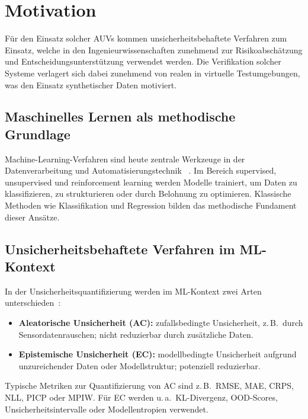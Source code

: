 
\chapter{Motivation}
\label{chapter:motivation}

Für den Einsatz solcher AUVs kommen unsicherheitsbehaftete Verfahren zum Einsatz, welche in den Ingenieurwissenschaften zunehmend zur Risikoabschätzung und Entscheidungsunterstützung verwendet werden. Die Verifikation solcher Systeme verlagert sich dabei zunehmend von realen in virtuelle Testumgebungen, was den Einsatz synthetischer Daten motiviert.

\section{Maschinelles Lernen als methodische Grundlage}

Machine-Learning-Verfahren sind heute zentrale Werkzeuge in der Datenverarbeitung und Automatisierungstechnik ~\parencite{Nof2023}. Im Bereich supervised, unsupervised und reinforcement learning werden Modelle trainiert, um Daten zu klassifizieren, zu strukturieren oder durch Belohnung zu optimieren. Klassische Methoden wie Klassifikation und Regression bilden das methodische Fundament dieser Ansätze.

\section{Unsicherheitsbehaftete Verfahren im ML-Kontext}

In der Unsicherheitsquantifizierung werden im ML-Kontext zwei Arten unterschieden~\parencite{Hullermeier2021}:

\begin{itemize}
  \item \textbf{Aleatorische Unsicherheit (AC):} zufallsbedingte Unsicherheit, z.\,B.\ durch Sensordatenrauschen; nicht reduzierbar durch zusätzliche Daten.
  \item \textbf{Epistemische Unsicherheit (EC):} modellbedingte Unsicherheit aufgrund unzureichender Daten oder Modellstruktur; potenziell reduzierbar.
\end{itemize}

\noindent
Typische Metriken zur Quantifizierung von AC sind z.\,B.\ RMSE, MAE, CRPS, NLL, PICP oder MPIW. Für EC werden u.\,a.\ KL-Divergenz, OOD-Scores, Unsicherheitsintervalle oder Modellentropien verwendet.


